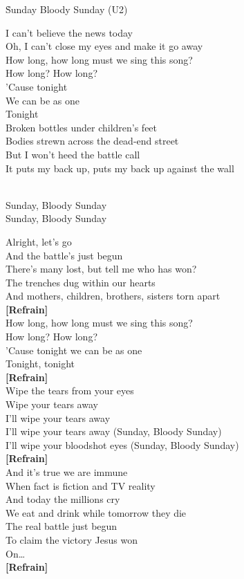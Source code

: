 \documentclass{novel}
\begin{document}
\newpage
\normalsize
\h*{Sunday Bloody Sunday (U2)}
\begin{multicols}{2}
I can't believe the news today \\
Oh, I can't close my eyes and make it go away \\
How long, how long must we sing this song? \\
How long? How long? \\
'Cause tonight \\
We can be as one \\
Tonight \\

Broken bottles under children's feet \\
Bodies strewn across the dead-end street \\
But I won't heed the battle call \\
It puts my back up, puts my back up against the wall \\

\begin{bfseries}
[Refrain:]\\
Sunday, Bloody Sunday \\
Sunday, Bloody Sunday \\
\end{bfseries}

Alright, let's go \\
And the battle's just begun \\
There's many lost, but tell me who has won? \\
The trenches dug within our hearts \\
And mothers, children, brothers, sisters torn apart \\

\textbf{[Refrain]}\\

How long, how long must we sing this song? \\
How long? How long? \\
'Cause tonight we can be as one \\
Tonight, tonight \\

\textbf{[Refrain]}\\

Wipe the tears from your eyes \\
Wipe your tears away \\
I'll wipe your tears away \\
I'll wipe your tears away (Sunday, Bloody Sunday) \\
I'll wipe your bloodshot eyes (Sunday, Bloody Sunday) \\

\textbf{[Refrain]}\\

And it's true we are immune \\
When fact is fiction and TV reality \\
And today the millions cry \\
We eat and drink while tomorrow they die \\
The real battle just begun \\
To claim the victory Jesus won \\
On… \\

\textbf{[Refrain]}\\
\end{multicols}
\end{document}
